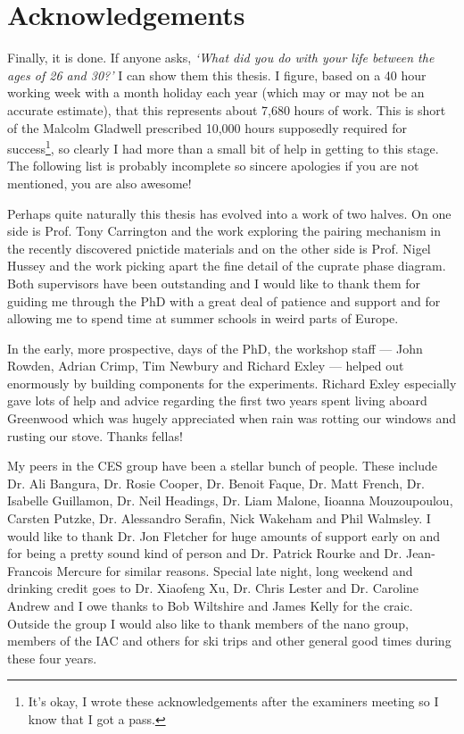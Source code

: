 \cleardoublepage

\section*{Acknowledgements}

Finally, it is done. If anyone asks, \textit{`What did you do with your life between the ages of 26 and 30?'} I can show them this thesis. I figure, based on a 40 hour working week with a month holiday each year (which may or may not be an accurate estimate), that this represents about 7,680 hours of work. This is short of the Malcolm Gladwell prescribed 10,000 hours supposedly required for success\footnote{It's okay, I wrote these acknowledgements after the examiners meeting so I know that I got a pass.}, so clearly I had more than a small bit of help in getting to this stage. The following list is probably incomplete so sincere apologies if you are not mentioned, you are also awesome!


Perhaps quite naturally this thesis has evolved into a work of two halves. On one side is Prof. Tony Carrington and the work exploring the pairing mechanism in the recently discovered pnictide materials and on the other side is Prof. Nigel Hussey and the work picking apart the fine detail of the cuprate phase diagram. Both supervisors have been outstanding and I would like to thank them for guiding me through the PhD with a great deal of patience and support and for allowing me to spend time at summer schools in weird parts of Europe.


In the early, more prospective, days of the PhD, the workshop staff --- John Rowden, Adrian Crimp, Tim Newbury and Richard Exley --- helped out enormously by building components for the experiments. Richard Exley especially gave lots of help and advice regarding the first two years spent living aboard Greenwood which was hugely appreciated when rain was rotting our windows and rusting our stove. Thanks fellas!

My peers in the CES group have been a stellar bunch of people. These include Dr. Ali Bangura, Dr. Rosie Cooper, Dr. Benoit Faque, Dr. Matt French, Dr. Isabelle Guillamon, Dr. Neil Headings, Dr. Liam Malone, Iioanna Mouzoupoulou, Carsten Putzke, Dr. Alessandro Serafin, Nick Wakeham and Phil Walmsley. I would like to thank Dr. Jon Fletcher for huge amounts of support early on and for being a pretty sound kind of person and Dr. Patrick Rourke and Dr. Jean-Francois Mercure for similar reasons. Special late night, long weekend and drinking credit goes to Dr. Xiaofeng Xu, Dr. Chris Lester and Dr. Caroline Andrew and I owe thanks to Bob Wiltshire and James Kelly for the craic. Outside the group I would also like to thank members of the nano group, members of the IAC and others for ski trips and other general good times during these four years.

